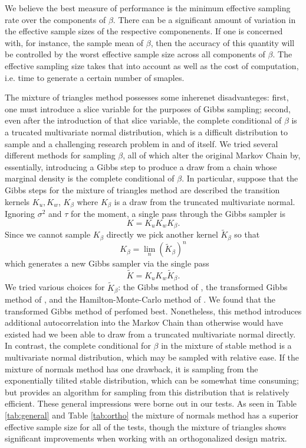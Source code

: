 \documentclass{article}
\begin{document}
We believe the best measure of performance is the minimum effective sampling
rate over the components of $\beta$.  There can be a significant amount of
variation in the effective sample sizes of the respective componenents.  If one
is concerned with, for instance, the sample mean of $\beta$, then the accuracy
of this quantity will be controlled by the worst effective sample size across
all components of $\beta$.  The effective sampling size takes that into account
as well as the cost of computation, i.e. time to generate a certain number of
smaples.

The mixture of triangles method possesses some inherenet disadvanteges: first,
one must introduce a slice variable for the purposes of Gibbs sampling; second,
even after the introduction of that slice variable, the complete conditional of
$\beta$ is a trucated multivariate normal distribution, which is a difficult
distribution to sample and a challenging research problem in and of itself.  We
tried several different methods for sampling $\beta$, all of which alter the
original Markov Chain by, essentially, introducing a Gibbs step to produce a
draw from a chain whose marginal density is the complete conditional of $\beta$.
In particular, suppose that the Gibbs steps for the mixture of triangles method
are described the transition kernels $K_u, K_w$, $K_\beta$ where $K_\beta$ is a
draw from the truncated multivariate normal.  Ignoring $\sigma^2$ and $\tau$ for
the moment, a single pass through the Gibbs sampler is
\[
K = K_u K_w K_\beta.
\]
Since we cannot sample $K_\beta$ directly we pick another kernel $\tilde
K_\beta$ so that
\[
K_\beta = \lim_n (\tilde K_\beta)^n
\]
which generates a new Gibbs sampler via the single pass
\[
\tilde K = K_u K_w \tilde K_\beta.
\]
We tried various choices for $\tilde K_\beta$: the Gibbs method of
\cite{geweke-1991}, the transformed Gibbs method of
\cite{rodriguez-yam-etal-2004}, and the Hamilton-Monte-Carlo method of
\cite{pakman-paninski-2012}.  We found that the transformed Gibbs method of
\cite{rodriguez-yam-etal-2004} perfomed best.  Nonetheless, this method
introduces additional autocorrelation into the Markov Chain than otherwise would
have existed had we been able to draw from a truncated multivariate normal
directly.  In contrast, the complete conditional for $\beta$ in the mixture of
stable method is a multivariate normal distribution, which may be sampled with
relative ease.  If the mixture of normals method has one drawback, it is
sampling from the exponentially tilited stable distribution, which can be
somewhat time consuming; but \cite{devroye-2009} provides an algorithm for
sampling from this distribution that is relatively efficient.  These general
impressions were borne out in our tests.  As seen in Table \ref{tab:general} and
Table \ref{tab:ortho} the mixture of normals method has a superior effective
sample size for all of the tests, though the mixture of triangles shows
significant improvements when working with an orthogonalized design matrix.
\end{document}
